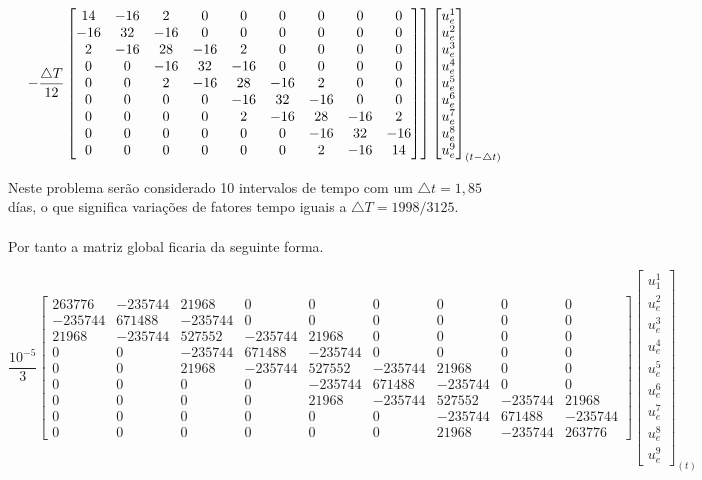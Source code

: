 \documentclass{article} %
\begin{document}
\begin{equation*}
\color{white}\left[\color{black}-\frac{\triangle T}{12}\begin{bmatrix}
14&-16 & 2& 0& 0& 0& 0& 0& 0\\
-16& 32& -16& 0& 0& 0& 0& 0& 0\\
2&-16&28&-16& 2& 0& 0& 0& 0\\
0&0& -16&32& -16& 0& 0& 0& 0\\
0&0&2&-16& 28&-16&2& 0& 0\\
0&0&0&0& -16&32&-16& 0& 0\\
0&0&0&0&2&-16&28&-16&2\\
0&0&0&0&0&0&-16&32&-16\\
0&0&0&0&0&0&2&-16&14
\end{bmatrix}\right]\color{black}\begin{bmatrix}
u_e^1\\
u_e^2\\
u_e^3\\
u_e^4\\
u_e^5\\
u_e^6\\
u_e^7\\
u_e^8\\
u_e^9
\end{bmatrix}_{(t-\triangle t)}
\end{equation*}



\indent Neste problema serão considerado 10 intervalos de tempo com um \(\triangle t=1,85\) días, o que significa variações de fatores tempo iguais a \(\triangle T=1998/3125\).\\
\\
\indent Por tanto a matriz global ficaria da seguinte forma.

\begin{equation*}
\frac{10^{-5}}{3}\begin{bmatrix}
263776&-235744&21968&0&0&0&0&0&0\\
-235744&671488& -235744& 0& 0& 0& 0& 0& 0\\
21968&-235744&527552&-235744&21968& 0& 0& 0& 0\\
0&0&-235744&671488&-235744& 0& 0& 0& 0\\
0&0&21968&-235744&527552&-235744&21968& 0& 0\\
0&0&0&0& -235744&671488&-235744& 0& 0\\
0&0&0&0&21968&-235744&527552&-235744&21968\\
0&0&0&0&0&0&-235744&671488&-235744\\
0&0&0&0&0&0&21968&-235744&263776
\end{bmatrix}\begin{bmatrix}
u_1^1\\
u_e^2\\
u_e^3\\
u_e^4\\
u_e^5\\
u_e^6\\
u_e^7\\
u_e^8\\
u_e^9
\end{bmatrix}_{(t)}
\end{equation*}
\end{document}
